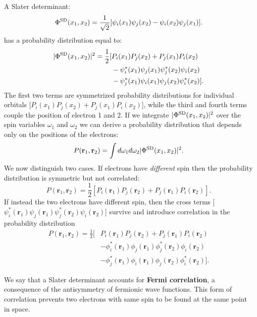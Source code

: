 \documentclass[../Main/chem532-notes.tex]{subfiles}
\begin{document}
\begin{example}
A Slater determinant:
\begin{equation}
\Phi^{\rm SD}(x_1,x_2) = \frac{1}{\sqrt{2}} [ \psi_i(x_1) \psi_j(x_2) - \psi_i(x_2) \psi_j(x_1)].
\end{equation}
has a probability distribution equal to:
\begin{equation}
\begin{split}
|\Phi^{\rm SD}(x_1,x_2)|^2 = \frac{1}{2} [&
P_i(x_1) P_j(x_2) +  P_j(x_1) P_i(x_2) \\
&-  \psi_i^*(x_1)\psi_j(x_1)  \psi_j^*(x_2) \psi_i(x_2)\\
&- \psi_j^*(x_1)\psi_i(x_1) \psi_j(x_2) \psi_i^*(x_2)  
].
\end{split}
\end{equation}
The first two terms are symmetrized probability distributions for individual orbitals [$P_i(x_1) P_j(x_2) +  P_j(x_1) P_i(x_2)$], while the third and fourth terms couple the position of electron 1 and 2.
If we integrate $|\Phi^{\rm SD}(x_1,x_2)|^2$ over the spin variables $\omega_1$ and $\omega_2$ we can derive a probability distribution that depends only on the positions of the electrons:
\begin{equation}
P(\mathbf{r}_1,\mathbf{r}_2) =
\int d\omega_1 d\omega_2 |\Phi^{\rm SD}(x_1,x_2)|^2.
\end{equation}
We now distinguish two cases.
If electrons have \textit{different} spin then the probability distribution is symmetric but not correlated:
\begin{equation}
P(\mathbf{r}_1,\mathbf{r}_2) = \frac{1}{2} [
P_i(\mathbf{r}_1) P_j(\mathbf{r}_2) +  P_j(\mathbf{r}_1) P_i(\mathbf{r}_2) ].
\end{equation}
If instead the two electrons have different spin, then the cross terms [$\psi_i^*(\mathbf{r}_1)\psi_j(\mathbf{r}_1)  \psi_j^*(\mathbf{r}_2) \psi_i(\mathbf{r}_2)$] survive and introduce correlation in the probability distribution
\begin{equation}
\begin{split}
P(\mathbf{r}_1,\mathbf{r}_2) = \frac{1}{2} [&
P_i(\mathbf{r}_1) P_j(\mathbf{r}_2) +  P_j(\mathbf{r}_1) P_i(\mathbf{r}_2) \\
&-  \phi_i^*(\mathbf{r}_1)\phi_j(\mathbf{r}_1)  \phi_j^*(\mathbf{r}_2) \phi_i(\mathbf{r}_2)\\
&- \phi_j^*(\mathbf{r}_1)\phi_i(\mathbf{r}_1) \phi_j(\mathbf{r}_2) \phi_i^*(\mathbf{r}_2)].
\end{split}
\end{equation}

We say that a Slater determinant accounts for \textbf{Fermi correlation}, a consequence of the antisymmetry of fermionic wave functions.
This form of correlation prevents two electrons with same spin to be found at the same point in space.
\end{example}
\end{document}
